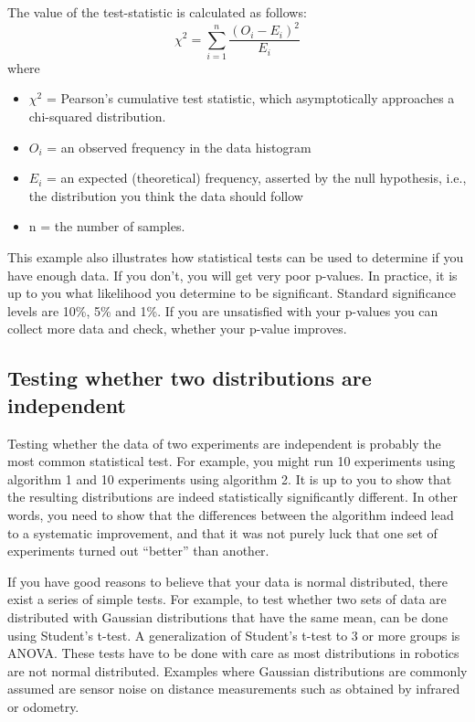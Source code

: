 The value of the test-statistic is calculated as follows:
\begin{equation}
\chi^2 = \sum_{i=1}^{n} \frac{(O_i - E_i)^2}{E_i}
\end{equation}
where
\begin{itemize}
\item $ \chi^2$ = Pearson's cumulative test statistic, which asymptotically approaches a chi-squared distribution.
\item $ O_i$ = an observed frequency in the data histogram
\item $ E_i$ = an expected (theoretical) frequency, asserted by the null hypothesis, i.e., the distribution you think the data should follow
\item n = the number of samples.
\end{itemize}
This example also illustrates how statistical tests can be used to determine if you have enough data. If you don't, you will get very poor p-values.  In practice, it is up to you what likelihood you determine to be significant. Standard significance levels are 10\%, 5\% and 1\%. If you are unsatisfied with your p-values you can collect more data and check, whether your p-value improves.

\subsection{Testing whether two distributions are independent}
Testing whether the data of two experiments are independent is probably the most common statistical test. For example, you might run 10 experiments using algorithm 1 and 10 experiments using algorithm 2. It is up to you to show that the resulting distributions are indeed statistically significantly different. In other words, you need to show that the differences between the algorithm indeed lead to a systematic improvement, and that it was not purely luck that one set of experiments turned out ``better'' than another.

If you have good reasons to believe that your data is normal distributed, there exist a series of simple tests. For example, to test whether two sets of data are distributed with Gaussian distributions that have the same mean, can be done using Student's t-test. A generalization of Student's t-test to 3 or more groups is ANOVA. These tests have to be done with care as most distributions in robotics are not normal distributed. Examples where  Gaussian distributions are commonly assumed are sensor noise on distance measurements such as obtained by infrared or odometry.

